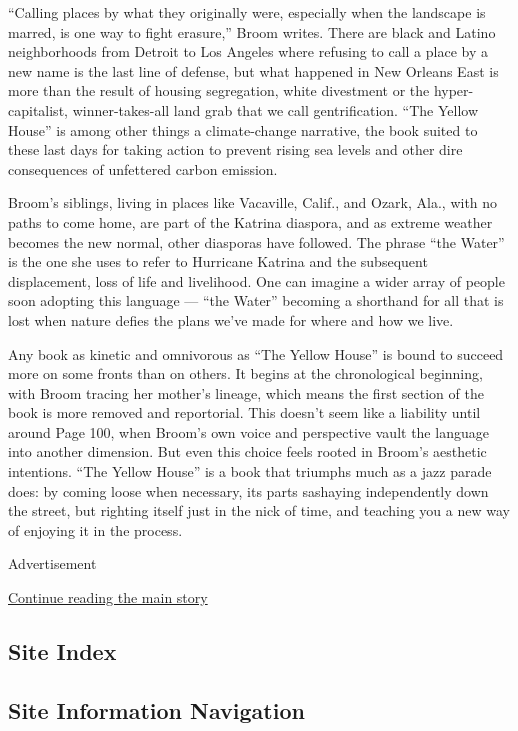 ``Calling places by what they originally were, especially when the
landscape is marred, is one way to fight erasure,'' Broom writes. There
are black and Latino neighborhoods from Detroit to Los Angeles where
refusing to call a place by a new name is the last line of defense, but
what happened in New Orleans East is more than the result of housing
segregation, white divestment or the hyper-capitalist, winner-takes-all
land grab that we call gentrification. ``The Yellow House'' is among
other things a climate-change narrative, the book suited to these last
days for taking action to prevent rising sea levels and other dire
consequences of unfettered carbon emission.

Broom's siblings, living in places like Vacaville, Calif., and Ozark,
Ala., with no paths to come home, are part of the Katrina diaspora, and
as extreme weather becomes the new normal, other diasporas have
followed. The phrase ``the Water'' is the one she uses to refer to
Hurricane Katrina and the subsequent displacement, loss of life and
livelihood. One can imagine a wider array of people soon adopting this
language --- ``the Water'' becoming a shorthand for all that is lost
when nature defies the plans we've made for where and how we live.

Any book as kinetic and omnivorous as ``The Yellow House'' is bound to
succeed more on some fronts than on others. It begins at the
chronological beginning, with Broom tracing her mother's lineage, which
means the first section of the book is more removed and reportorial.
This doesn't seem like a liability until around Page 100, when Broom's
own voice and perspective vault the language into another dimension. But
even this choice feels rooted in Broom's aesthetic intentions. ``The
Yellow House'' is a book that triumphs much as a jazz parade does: by
coming loose when necessary, its parts sashaying independently down the
street, but righting itself just in the nick of time, and teaching you a
new way of enjoying it in the process.

Advertisement

\protect\hyperlink{after-bottom}{Continue reading the main story}

\hypertarget{site-index}{%
\subsection{Site Index}\label{site-index}}

\hypertarget{site-information-navigation}{%
\subsection{Site Information
Navigation}\label{site-information-navigation}}

